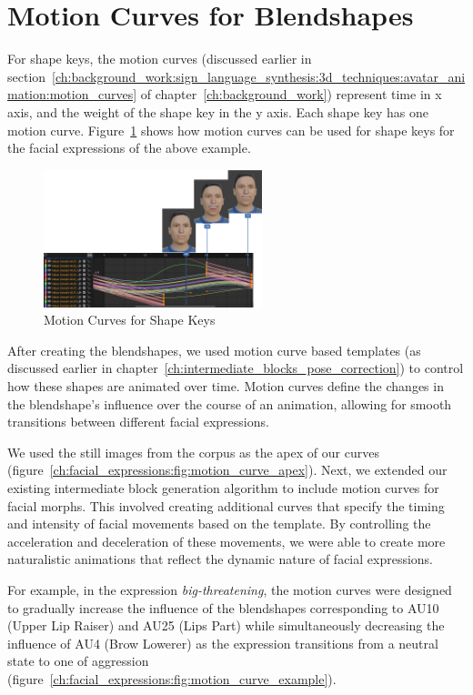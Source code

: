 \documentclass[../../main]{subfiles}
\begin{document}
\section{Motion Curves for Blendshapes}
\label{ch:facial_expressions:motion_curves_for_blendshapes}

For shape keys, the motion curves (discussed earlier in section~\ref{ch:background_work:sign_language_synthesis:3d_techniques:avatar_animation:motion_curves} of chapter~\ref{ch:background_work}) represent time in x axis, and the weight of the shape key in the y axis. Each shape key has one motion curve. Figure~\ref{fig:motion_curves_shape_keys} shows how motion curves can be used for shape keys for the facial expressions of the above example.

\begin{figure}
    \centering \includegraphics[width = 2.5in]{chapters/intermediate_blocks_pose_correction/images/motion_curves_shape_keys.png}
    \caption{Motion Curves for Shape Keys}
    \label{fig:motion_curves_shape_keys}
\end{figure}

After creating the blendshapes, we used motion curve based templates (as discussed earlier in chapter~\ref{ch:intermediate_blocks_pose_correction}) to control how these shapes are animated over time. Motion curves define the changes in the blendshape's influence over the course of an animation, allowing for smooth transitions between different facial expressions.

We used the still images from the corpus as the apex of our curves (figure~\ref{ch:facial_expressions:fig:motion_curve_apex}). Next, we extended our existing intermediate block generation algorithm to include motion curves for facial morphs. This involved creating additional curves that specify the timing and intensity of facial movements based on the template. By controlling the acceleration and deceleration of these movements, we were able to create more naturalistic animations that reflect the dynamic nature of facial expressions.

For example, in the expression \emph{big-threatening}, the motion curves were designed to gradually increase the influence of the blendshapes corresponding to AU10 (Upper Lip Raiser) and AU25 (Lips Part) while simultaneously decreasing the influence of AU4 (Brow Lowerer) as the expression transitions from a neutral state to one of aggression (figure~\ref{ch:facial_expressions:fig:motion_curve_example}).
\end{document}
